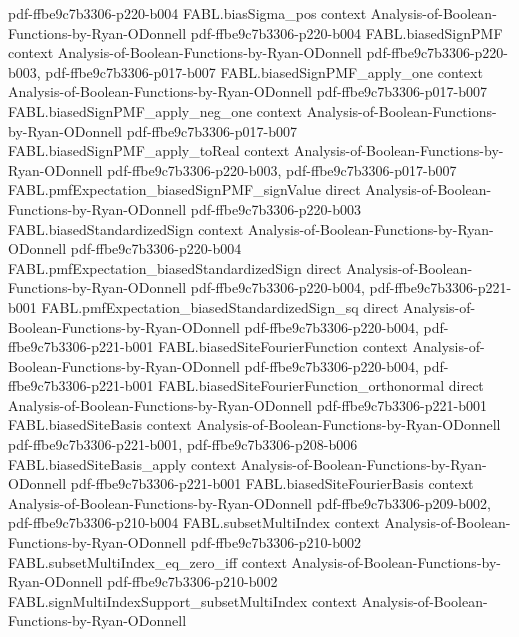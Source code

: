 \begin{theorem}
  {pdf-ffbe9c7b3306-p220-b004}
\proofstep
  {FABL.biasSigma_pos}
  {context}
  {Analysis-of-Boolean-Functions-by-Ryan-ODonnell}
  {pdf-ffbe9c7b3306-p220-b004}
\proofstep
  {FABL.biasedSignPMF}
  {context}
  {Analysis-of-Boolean-Functions-by-Ryan-ODonnell}
  {pdf-ffbe9c7b3306-p220-b003,
    pdf-ffbe9c7b3306-p017-b007}
\proofstep
  {FABL.biasedSignPMF_apply_one}
  {context}
  {Analysis-of-Boolean-Functions-by-Ryan-ODonnell}
  {pdf-ffbe9c7b3306-p017-b007}
\proofstep
  {FABL.biasedSignPMF_apply_neg_one}
  {context}
  {Analysis-of-Boolean-Functions-by-Ryan-ODonnell}
  {pdf-ffbe9c7b3306-p017-b007}
\proofstep
  {FABL.biasedSignPMF_apply_toReal}
  {context}
  {Analysis-of-Boolean-Functions-by-Ryan-ODonnell}
  {pdf-ffbe9c7b3306-p220-b003,
    pdf-ffbe9c7b3306-p017-b007}
\proofstep
  {FABL.pmfExpectation_biasedSignPMF_signValue}
  {direct}
  {Analysis-of-Boolean-Functions-by-Ryan-ODonnell}
  {pdf-ffbe9c7b3306-p220-b003}
\proofstep
  {FABL.biasedStandardizedSign}
  {context}
  {Analysis-of-Boolean-Functions-by-Ryan-ODonnell}
  {pdf-ffbe9c7b3306-p220-b004}
\proofstep
  {FABL.pmfExpectation_biasedStandardizedSign}
  {direct}
  {Analysis-of-Boolean-Functions-by-Ryan-ODonnell}
  {pdf-ffbe9c7b3306-p220-b004,
    pdf-ffbe9c7b3306-p221-b001}
\proofstep
  {FABL.pmfExpectation_biasedStandardizedSign_sq}
  {direct}
  {Analysis-of-Boolean-Functions-by-Ryan-ODonnell}
  {pdf-ffbe9c7b3306-p220-b004,
    pdf-ffbe9c7b3306-p221-b001}
\proofstep
  {FABL.biasedSiteFourierFunction}
  {context}
  {Analysis-of-Boolean-Functions-by-Ryan-ODonnell}
  {pdf-ffbe9c7b3306-p220-b004,
    pdf-ffbe9c7b3306-p221-b001}
\proofstep
  {FABL.biasedSiteFourierFunction_orthonormal}
  {direct}
  {Analysis-of-Boolean-Functions-by-Ryan-ODonnell}
  {pdf-ffbe9c7b3306-p221-b001}
\proofstep
  {FABL.biasedSiteBasis}
  {context}
  {Analysis-of-Boolean-Functions-by-Ryan-ODonnell}
  {pdf-ffbe9c7b3306-p221-b001,
    pdf-ffbe9c7b3306-p208-b006}
\proofstep
  {FABL.biasedSiteBasis_apply}
  {context}
  {Analysis-of-Boolean-Functions-by-Ryan-ODonnell}
  {pdf-ffbe9c7b3306-p221-b001}
\proofstep
  {FABL.biasedSiteFourierBasis}
  {context}
  {Analysis-of-Boolean-Functions-by-Ryan-ODonnell}
  {pdf-ffbe9c7b3306-p209-b002,
    pdf-ffbe9c7b3306-p210-b004}
\proofstep
  {FABL.subsetMultiIndex}
  {context}
  {Analysis-of-Boolean-Functions-by-Ryan-ODonnell}
  {pdf-ffbe9c7b3306-p210-b002}
\proofstep
  {FABL.subsetMultiIndex_eq_zero_iff}
  {context}
  {Analysis-of-Boolean-Functions-by-Ryan-ODonnell}
  {pdf-ffbe9c7b3306-p210-b002}
\proofstep
  {FABL.signMultiIndexSupport_subsetMultiIndex}
  {context}
  {Analysis-of-Boolean-Functions-by-Ryan-ODonnell}

\end{theorem}
